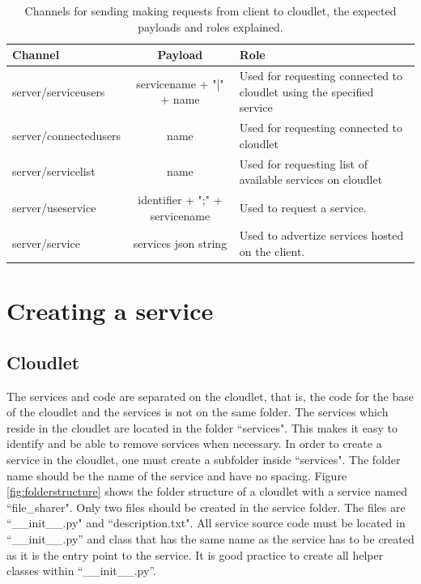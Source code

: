 \begin{table}[!h]
 \caption{Channels for sending making requests from client to cloudlet, the expected payloads and roles explained.}
 \label{table:outgoingchannels}
  \begin{tabular}{ | l | c | p{5cm} |}
    \hline
    Channel & Payload & Role \\ \hline \hline
    server/serviceusers & servicename + "|" + name & Used for requesting connected to cloudlet using the specified service \\ \hline
    server/connectedusers & name & Used for requesting connected to cloudlet \\ \hline
    server/servicelist & name & Used for requesting list of available services on cloudlet \\ \hline
    server/useservice & identifier + ";" + servicename & Used to request a service. \\ \hline
    server/service  & services json string & Used to advertize services hosted on the client. \\
    \hline
  \end{tabular}
\end{table}

\section{Creating a service}

\subsection{Cloudlet}
The services and code are separated on the cloudlet, that is, the code for the base of the cloudlet and the services is not on the same folder. The services which reside in the cloudlet are located in the folder ``services". This makes it easy to identify and be able to remove services when necessary. In order to create a service in the cloudlet, one must create a subfolder inside ``services". The folder name should be the name of the service and have no spacing. Figure \ref{fig:folderstructure} shows the folder structure of a cloudlet with a service named ``file\_sharer". Only two files should be created in the service folder. The files are ``\_\_init\_\_.py" and ``description.txt". All service source code must be located in ``\_\_init\_\_.py” and class that has the same name as the service has to be created as it is the entry point to the service. It is good practice to create all helper classes within ``\_\_init\_\_.py”.

